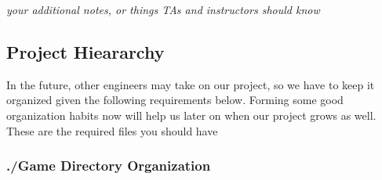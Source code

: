 {\itshape your additional notes, or things TA\textquotesingle{}s and instructors should know}

\subsection*{Project Hieararchy}

In the future, other engineers may take on our project, so we have to keep it organized given the following requirements below. Forming some good organization habits now will help us later on when our project grows as well. These are the required files you should have

\subsubsection*{./\+Game Directory Organization}


